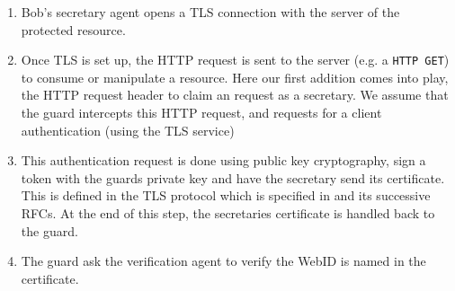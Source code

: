 \documentclass[a4paper]{llncs}
\begin{document}
\begin{enumerate}
    \item Bob's secretary agent opens a TLS connection with the server of the protected resource.
    \item Once TLS is set up, the HTTP request is sent to the server (e.g. a \verb!HTTP GET!) to consume or manipulate a resource.
        Here our first addition comes into play, the HTTP request header to claim an request as a secretary.
        We assume that the guard intercepts this HTTP request, and requests for a client authentication (using the TLS service)
    \item This authentication request is done using public key cryptography, sign a token with the guards private key and have the secretary send its certificate.
        This is defined in the TLS protocol which is specified in \cite{dierks-t-2012--a} and its successive RFCs.
        At the end of this step, the secretaries certificate is handled back to the guard.
    \item The guard ask the verification agent to verify the WebID is named in the certificate.

\end{enumerate}
\end{document}
